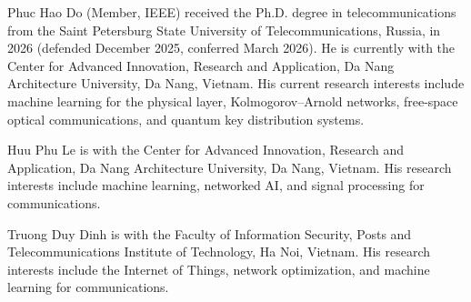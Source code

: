 \documentclass[journal]{IEEEtran}
\begin{document}



\vspace{-2mm}
\begin{IEEEbiographynophoto}{Phuc Hao Do}
(Member, IEEE) received the Ph.D. degree in telecommunications from the Saint
Petersburg State University of Telecommunications, Russia, in 2026 (defended
December 2025, conferred March 2026). He is currently with the Center for Advanced
Innovation, Research and Application, Da Nang Architecture University, Da Nang,
Vietnam. His current research interests include machine learning for the physical layer,
Kolmogorov--Arnold networks, free-space optical communications, and quantum key
distribution systems.
\end{IEEEbiographynophoto}
\begin{IEEEbiographynophoto}{Huu Phu Le}
is with the Center for Advanced Innovation, Research and Application, Da Nang
Architecture University, Da Nang, Vietnam. His research interests include machine
learning, networked AI, and signal processing for communications.
\end{IEEEbiographynophoto}
\begin{IEEEbiographynophoto}{Truong Duy Dinh}
is with the Faculty of Information Security, Posts and Telecommunications Institute
of Technology, Ha Noi, Vietnam. His research interests include the Internet of
Things, network optimization, and machine learning for communications.
\end{IEEEbiographynophoto}
\end{document}
